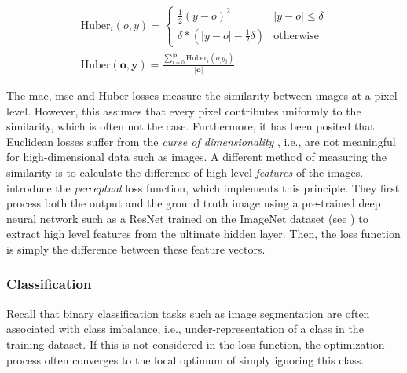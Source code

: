 \begin{equation}
\label{eq:huber}
\begin{gathered}
\text{Huber}_i(o,y)={\begin{cases}{\frac {1}{2}}(y-o)^{2}&|y-o|\leq \delta\\\delta * \left(|y-o|-{\frac {1}{2}}\delta \right)&\text{otherwise}\end{cases}}\\
\text{Huber}(\mathbf{o},\mathbf{y})=\frac{\sum_{i=0}^{|\mathbf{o}|} \text{Huber}_i(o_,y_i)}{|\mathbf{o}|}
\end{gathered}
\end{equation}


The \gls{mae}, \gls{mse} and Huber losses measure the similarity between images at a pixel level. However, this assumes that every pixel contributes uniformly to the similarity, which is often not the case. Furthermore, it has been posited that Euclidean losses suffer from the \emph{curse of dimensionality} \citep{DBLP:journals/sadm/ZimekSK12}, i.e., are not meaningful for high-dimensional data such as images.
A different method of measuring the similarity is to calculate the difference of high-level \emph{features} of the images. \citet{DBLP:conf/eccv/JohnsonAF16} introduce the \emph{perceptual} loss function, which implements this principle. They first process both the output and the ground truth image using a pre-trained deep neural network such as a ResNet trained on the ImageNet dataset (see ) to extract high level features from the ultimate hidden layer. Then, the loss function is simply the difference between these feature vectors.

\subsubsection{Classification}
Recall that binary classification tasks such as image segmentation are often associated with class imbalance, i.e., under-representation of a class in the training dataset. If this is not considered in the loss function, the optimization process often converges to the local optimum of simply ignoring this class.

